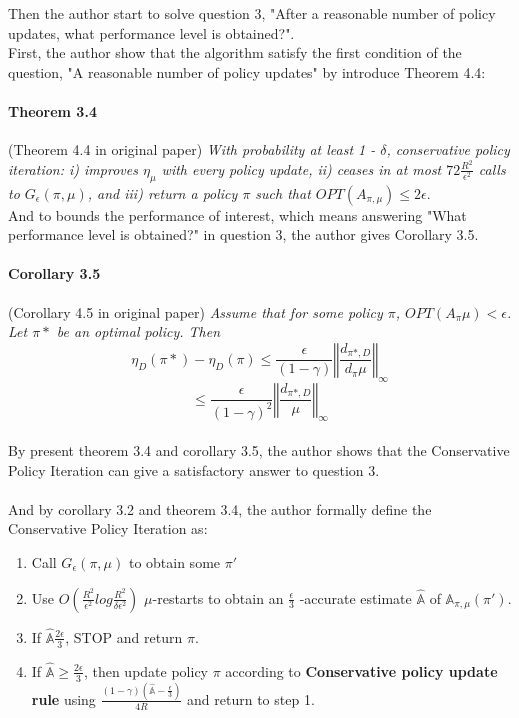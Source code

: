 \begin{itemize}
\newpage
Then the author start to solve question 3, "After a reasonable number of policy updates, what performance level is obtained?".\\ First, the author show that the algorithm satisfy the first condition
of the question, "A reasonable number of policy updates" by introduce Theorem 4.4:
\paragraph{Theorem 3.4} (Theorem 4.4 in original paper)
\emph{With probability at least 1 - $\delta$, conservative policy iteration: i)
improves $\eta_{\mu}$ with every policy update, ii) ceases in at most $72 
\frac{R^{2}}{\epsilon^{2}}$ calls to $G_{\epsilon}(\pi, \mu)$, and iii) return a policy $\pi$ such that $OPT(A_{\pi, \mu}) \leq 2 \epsilon$}. \\

And to bounds the performance of interest, which means answering "What performance level is obtained?" in question 3, the author gives Corollary 3.5.

\paragraph{Corollary 3.5} (Corollary 4.5 in original paper)
\emph{Assume that for some policy $\pi$, $OPT(A_{\pi}{\mu}) < \epsilon$. Let
$\pi*$ be an optimal policy. Then}
\[\eta_{D}(\pi*) - \eta_{D}(\pi) \leq \frac{\epsilon}{(1 - \gamma)} 
\left\Vert\frac{d_{\pi*, D}}{d_{\pi}{\mu}} \right\Vert_{\infty} \]
\[\leq \frac{\epsilon}{(1 - \gamma)^{2}}
\left\Vert \frac{d_{\pi*, D}}{\mu} \right\Vert_{\infty}\]
\\
By present theorem 3.4 and corollary 3.5, the author shows that the Conservative Policy Iteration can give a satisfactory answer to question 3. 
\\\\
And by corollary 3.2 and theorem 3.4, the author formally define the Conservative Policy Iteration as: \\

\begin{enumerate}[(1)]
\item Call $G_{\epsilon}(\pi, \mu)$ to obtain some $\pi'$ \\
\item Use $O(\frac{R^{2}}{\epsilon^{2}} log \frac {R^{2}}{\delta \epsilon^{2}})$
$\mu$-restarts to obtain an $\frac{\epsilon}{3}$ -accurate estimate $\hat{\mathbb{A}}$ of $\mathbb{A}_{\pi, \mu}(\pi')$. \\
\item If $\hat{\mathbb{A}} \frac{2\epsilon}{3}$, STOP and return $\pi$. \\
\item If $\hat{\mathbb{A}} \geq \frac{2\epsilon}{3}$, then update policy $\pi$ according to \textbf{Conservative policy update rule} using
$\frac{(1 - \gamma)(\hat{\mathbb{A}} - \frac{\epsilon}{3})}{4R}$ and return 
to step 1. \\
\end{enumerate}


\end{itemize}
